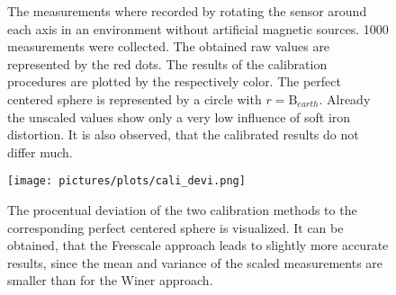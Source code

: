 \begin{figure}
\centering
	\hfill
\caption{The measurements where recorded by rotating the sensor around each axis in an environment without artificial magnetic sources. 1000 measurements were collected. The obtained raw values are represented by the red dots. The results of the calibration procedures are plotted by the respectively color. The perfect centered sphere is represented by a circle with $ r=\mathrm{B}_{earth} $. Already the unscaled values show only a very low influence of soft iron distortion. It is also observed, that the calibrated results do not differ much.}
\end{figure}

\begin{figure}
\centering
\texttt{[image: pictures/plots/cali\_devi.png]}
\caption{The procentual deviation of the two calibration methods to the corresponding perfect centered sphere is visualized. It can be obtained, that the Freescale approach leads to slightly more accurate results, since the mean and variance of the scaled measurements are smaller than for the Winer approach.}
\label{fig:devi}
\end{figure}


